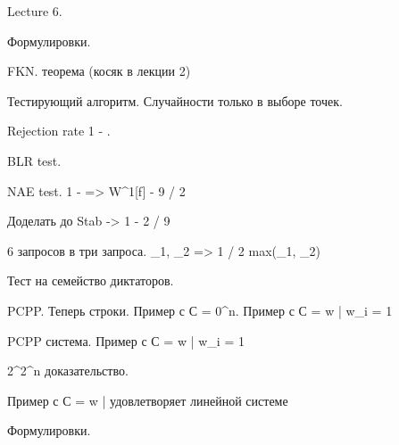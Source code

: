 Lecture 6.

Формулировки.

FKN. теорема (косяк в лекции 2)


Тестирующий алгоритм. Случайности только в выборе точек.

Rejection rate 1 - \lambda \epsilon.

BLR test.

NAE test.  1 - \epsilon => W^1[f]  - 9 / 2 \epsilon

Доделать до Stab -> 1 - 2 / 9 \eps


6 запросов в три запроса.
\lambda_1, \lambda_2 => 1 / 2 max(\lambda_1, \lambda_2)



Тест на семейство диктаторов.


PCPP.
Теперь строки.
Пример с С = {0^n}.
Пример с С = {w | \sum w_i = 1}

PCPP система.
Пример с С = {w | \sum w_i = 1}


2^{2^n} доказательство.


Пример с С = {w | удовлетворяет линейной системе}


Формулировки.
